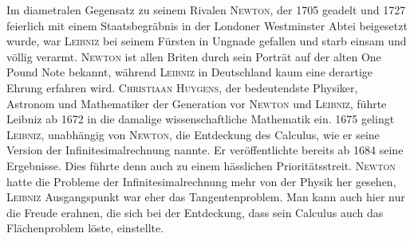 \documentclass[%
11pt,%
twoside,%
titlepage,%
german,%
headsepline%
]{scrartcl}
\begin{document}
Im diametralen Gegensatz zu seinem Rivalen \textsc{Newton}, der 1705 geadelt und 1727 feierlich mit einem Staatsbegr\"abnis in der Londoner Westminster Abtei beigesetzt wurde, war \textsc{Leibniz} bei seinem F\"ursten in Ungnade gefallen und starb einsam und v\"ollig verarmt. \textsc{Newton} ist allen Briten durch sein Portr\"at auf der alten One Pound Note bekannt, w\"ahrend \textsc{Leibniz} in Deutschland kaum eine derartige Ehrung erfahren wird.
\textsc{Christiaan Huygens}, der bedeutendste Physiker, Astronom und Mathematiker der Generation vor \textsc{Newton} und \textsc{Leibniz}, f\"uhrte Leibniz ab 1672 in die damalige wissenschaftliche Mathematik ein. 1675 gelingt \textsc{Leibniz}, unabh\"angig von \textsc{Newton}, die Entdeckung des \glqq Calculus\grqq, wie er seine Version der Infinitesimalrechnung nannte. Er ver\"offentlichte bereits ab 1684 seine Ergebnisse. Dies f\"uhrte denn auch zu einem h\"asslichen Priorit\"atsstreit.
\textsc{Newton} hatte die Probleme der Infinitesimalrechnung mehr von der Physik her gesehen, \textsc{Leibniz} Ausgangspunkt war eher das Tangentenproblem. Man kann auch hier nur die Freude erahnen, die sich bei der Entdeckung, dass sein Calculus auch das Fl\"achenproblem l\"oste, einstellte.
\end{document}
